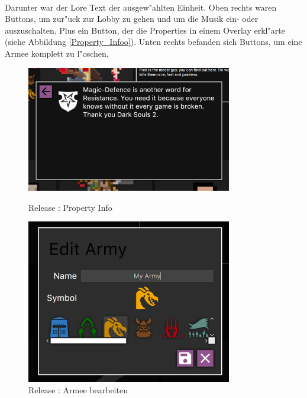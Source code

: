 \documentclass[12pt, titlepage]{scrartcl}
\newcommand{\RN}[1]{%
	\textup{\uppercase\expandafter{\romannumeral#1}}%
}
\begin{document}
			    \ \\ Darunter war der Lore Text der ausgew"ahlten Einheit. Oben rechts waren Buttons, um zur"uck zur Lobby zu gehen und um die Musik ein- oder auszuschalten. Plus ein Button, der die Properties in einem Overlay erkl"arte (siehe Abbildung \ref{Property_Infoo}). Unten rechts befanden sich Buttons, um eine Armee komplett zu l"oschen, \\
			    \begin{figure}[H]
                    \centering
                    \begin{minipage}{0.5\textwidth}
                        \centering
                        \includegraphics[width=0.8\textwidth]{images/old_state/army_manager/PropertyInfo.png}
                        \caption{Release \RN{2}: Property Info}
                        \label{Property_Infoo}
                    \end{minipage}%
                    \begin{minipage}{0.5\textwidth}
                        \centering
                        \includegraphics[width=0.8\textwidth]{images/old_state/army_manager/EditArmy.png}
                        \caption{Release \RN{2}: Armee bearbeiten}
                        \label{Edit_Army}
                    \end{minipage}
                \end{figure}
\end{document}
